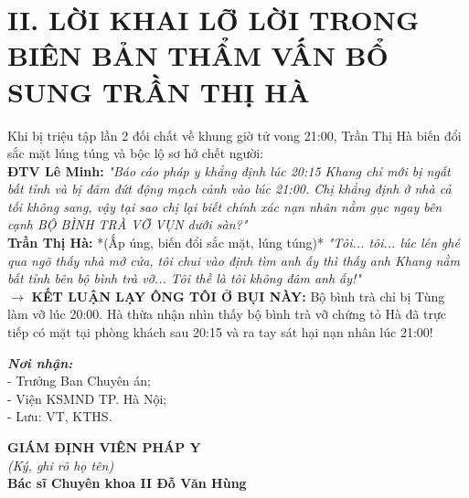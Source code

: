 \documentclass[12pt,a4paper]{article}
\begin{document}
\section*{II. LỜI KHAI LỠ LỜI TRONG BIÊN BẢN THẨM VẤN BỔ SUNG TRẦN THỊ HÀ}
\noindent Khi bị triệu tập lần 2 đối chất về khung giờ tử vong 21:00, Trần Thị Hà biến đổi sắc mặt lúng túng và bộc lộ sơ hở chết người:\\
\textbf{ĐTV Lê Minh:} \textit{"Báo cáo pháp y khẳng định lúc 20:15 Khang chỉ mới bị ngất bất tỉnh và bị đâm đứt động mạch cảnh vào lúc 21:00. Chị khẳng định ở nhà cả tối không sang, vậy tại sao chị lại biết chính xác nạn nhân nằm gục ngay bên cạnh BỘ BÌNH TRÀ VỠ VỤN dưới sàn?"}\\
\textbf{Trần Thị Hà:} *(Ấp úng, biến đổi sắc mặt, lúng túng)* \textit{"Tôi... tôi... lúc lén ghé qua ngõ thấy nhà mở cửa, tôi chui vào định tìm anh ấy thì thấy anh Khang nằm bất tỉnh bên bộ bình trà vỡ... Tôi thề là tôi không đâm anh ấy!"}\\[0.1cm]
$\rightarrow$ \textbf{KẾT LUẬN LẠY ÔNG TÔI Ở BỤI NÀY:} Bộ bình trà chỉ bị Tùng làm vỡ lúc 20:00. Hà thừa nhận nhìn thấy bộ bình trà vỡ chứng tỏ Hà đã trực tiếp có mặt tại phòng khách sau 20:15 và ra tay sát hại nạn nhân lúc 21:00!

\vspace{0.8cm}

\noindent
\begin{minipage}[t]{0.45\textwidth}
    \small
    \textbf{\textit{Nơi nhận:}}\\
    - Trưởng Ban Chuyên án;\\
    - Viện KSMND TP. Hà Nội;\\
    - Lưu: VT, KTHS.
\end{minipage}
\hfill
\begin{minipage}[t]{0.5\textwidth}
    \begin{center}
        \small
        \textbf{GIÁM ĐỊNH VIÊN PHÁP Y}\\
        \textit{(Ký, ghi rõ họ tên)}\\[1.5cm]
        \textbf{Bác sĩ Chuyên khoa II Đỗ Văn Hùng}
    \end{center}
\end{minipage}
\end{document}
